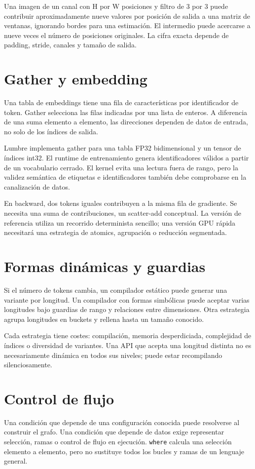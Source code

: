 \documentclass[12pt,a4paper,oneside]{report}
\begin{document}
\begin{ejemplo}
Una imagen de un canal con H por W posiciones y filtro de 3 por 3 puede contribuir aproximadamente nueve valores por posición de salida a una matriz de ventanas, ignorando bordes para una estimación. El intermedio puede acercarse a nueve veces el número de posiciones originales. La cifra exacta depende de padding, stride, canales y tamaño de salida.

\end{ejemplo}
\section{Gather y embedding}
Una tabla de embeddings tiene una fila de características por identificador de token. Gather selecciona las filas indicadas por una lista de enteros. A diferencia de una suma elemento a elemento, las direcciones dependen de datos de entrada, no solo de los índices de salida.

Lumbre implementa gather para una tabla FP32 bidimensional y un tensor de índices int32. El runtime de entrenamiento genera identificadores válidos a partir de un vocabulario cerrado. El kernel evita una lectura fuera de rango, pero la validez semántica de etiquetas e identificadores también debe comprobarse en la canalización de datos.

En backward, dos tokens iguales contribuyen a la misma fila de gradiente. Se necesita una suma de contribuciones, un scatter-add conceptual. La versión de referencia utiliza un recorrido determinista sencillo; una versión GPU rápida necesitará una estrategia de atomics, agrupación o reducción segmentada.

\section{Formas dinámicas y guardias}
Si el número de tokens cambia, un compilador estático puede generar una variante por longitud. Un compilador con formas simbólicas puede aceptar varias longitudes bajo guardias de rango y relaciones entre dimensiones. Otra estrategia agrupa longitudes en buckets y rellena hasta un tamaño conocido.

Cada estrategia tiene costes: compilación, memoria desperdiciada, complejidad de índices o diversidad de variantes. Una API que acepta una longitud distinta no es necesariamente dinámica en todos sus niveles; puede estar recompilando silenciosamente.

\section{Control de flujo}
Una condición que depende de una configuración conocida puede resolverse al construir el grafo. Una condición que depende de datos exige representar selección, ramas o control de flujo en ejecución. \texttt{where} calcula una selección elemento a elemento, pero no sustituye todos los bucles y ramas de un lenguaje general.
\end{document}
